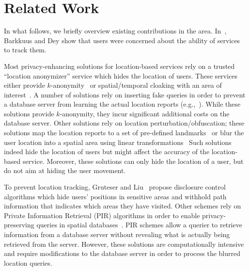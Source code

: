 \documentclass{llncs}
\begin{document}
\section{Related Work}\label{sec:related}

In what follows, we briefly overview existing contributions in the area.
In~\cite{Barkhuus03location-basedservices}, Barkkuus and Dey show that users were concerned about the ability of services to track them.

Most privacy-enhancing solutions for location-based services rely on a trusted ``location anonymizer'' service which hides the location of users. These services either
provide $k$-anonymity~\cite{Guha:2012:KLP:2228298.2228317,Gedik:2008:PLP:1340084.1340202,Sweeney:2002:AKA:774544.774553,Sweeney:2002:KAM:774544.774552,Samarati:2001:PRI:627337.628183} or spatial/temporal cloaking with an area of
interest~\cite{Chow:2007:EPC:1784462.1784477,Bamba:2008:SAL:1367497.1367531,Gruteser:2003:AUL:1066116.1189037,Kalnis:2007:PLI:1313047.1313203,DBLP:conf/infocom/WangXHZLX12}. A number of solutions rely on inserting fake queries in order to prevent a database server from learning the actual location reports (e.g.,~\cite{Kido05ananonymous}). While these
solutions provide $k$-anonymity, they incur significant additional costs on the database server. Other solutions rely on location perturbation/obfuscation; these solutions map the location reports to a set of pre-defined landmarks~\cite{Hong:2004:APU:990064.990087} or blur
the user location into a spatial area using linear transformations~\cite{Bamba:2008:SAL:1367497.1367531,Gruteser:2003:AUL:1066116.1189037,Kalnis:2007:PLI:1313047.1313203,Mokbel:2006:NCQ:1182635.1164193,Yiu:2010:ESS:1825238.1825264}
Such solutions indeed hide the location of users but might affect the accuracy of the location-based service. Moreover, these solutions
can only hide the location of a user, but do not aim at hiding the user movement.

To prevent location tracking, Gruteser and Liu~\cite{Gruteser:2004:PPC:1435702.1437404} propose disclosure control algorithms which hide users' positions in sensitive areas and withhold path information that
indicates which areas they have visited. Other schemes rely on Private Information Retrieval (PIR) algorithms in order to enable privacy-preserving queries in spatial databases~\cite{Ghinita:2008:PQL:1376616.1376631,Olumofin:2010:AEQ:1881151.1881157}. PIR schemes allow a querier to retrieve information
from a database server without revealing what is actually being retrieved
from the server. However, these solutions
are computationally intensive and require modifications to the database server in order to process the blurred location queries.
\end{document}
